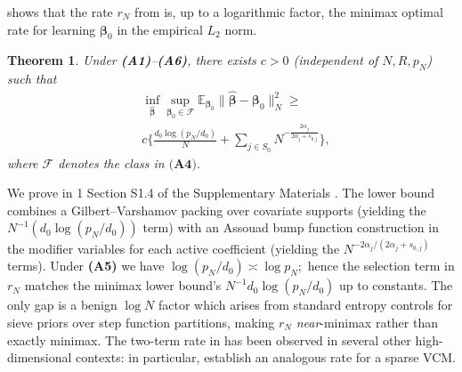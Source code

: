 \documentclass[11pt]{article}
\newcommand{\E}{\mathbb{E}} %
\newcommand{\bbeta}{\boldsymbol{\beta}}
\theoremstyle{plain}
\newtheorem{theorem}{Theorem}
\newtheorem{corollary}{Corollary}
\theoremstyle{definition}
\theoremstyle{plain}
\newcommand{\includesupp}{1}
\newcommand{\switchref}[2]{%
  \if\includesupp1%
    #1%
  \else%
    #2%
  \fi%
}
\begin{document}
 shows that the rate $r_{N}$ from  is, up to a logarithmic factor, the minimax optimal rate for learning $\bbeta_{0}$ in the empirical $L_2$ norm.
\begin{theorem}
\label{thm:minimax-main}
Under \textbf{(A1)}–\textbf{(A6)}, there exists $c>0$ (independent of $N,R,p_N$) such that
\begin{align*}
& \inf_{\widehat{\bm\beta}}
 \sup_{\bm\beta_0\in\mathcal F}
 \E_{\bm\beta_0}\big\|\widehat{\bm\beta}-\bm\beta_0\big\|_N^{2}
\ge \\
&c\Bigg\{
\frac{d_0\log (p_N/d_0)}{N} 
+ \sum_{j\in S_0} N^{-\frac{2\alpha_j}{2\alpha_j+s_{0,j}}}
\Bigg\},
\end{align*}
where $\mathcal F$ denotes the class in $\textbf{(A4)}$. \end{theorem}

We prove  in \switchref{}{Section S1.4 of the Supplementary Materials}.
The lower bound combines a Gilbert–Varshamov packing over covariate supports (yielding the $N^{-1}(d_0\log (p_N/d_0))$ term) with an Assouad bump function construction \citep[][Lemma 2.12]{Tsybakov2009} in the modifier variables for each active coefficient (yielding the $N^{-2\alpha_j/(2\alpha_j+s_{0,j})}$ terms). 
Under \textbf{(A5)} we have $\log(p_N/d_0) \asymp \log p_N;$ hence the selection term in $r_N$ matches the minimax lower bound’s $N^{-1}d_0 \log(p_N/d_0)$ up to constants. 
The only gap is a benign $\log N$ factor which arises from standard entropy controls for sieve priors over step function partitions, making $r_N$ \emph{near}-minimax rather than exactly minimax. 
The two-term rate in  has been observed in several other high-dimensional contexts: in particular, \citet{klopp2014} establish an analogous rate for a sparse VCM. 
\end{document}
